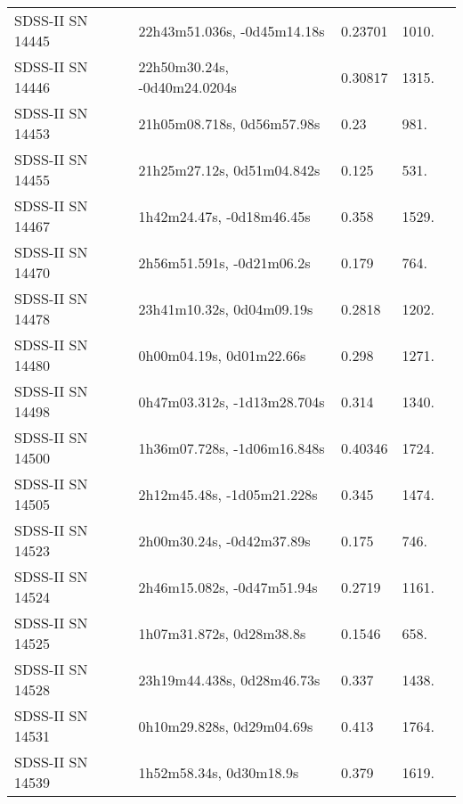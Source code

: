 \begin{longtable}{lllll}
 SDSS-II SN 14445 &    22h43m51.036s, -0d45m14.18s &  0.23701 &          1010. &    \citet{2016SDSSD.C...0000:} \\
 SDSS-II SN 14446 &   22h50m30.24s, -0d40m24.0204s &  0.30817 &          1315. &    \citet{2016SDSSD.C...0000:} \\
 SDSS-II SN 14453 &     21h05m08.718s, 0d56m57.98s &     0.23 &           981. &    \citet{2011ApJ...738..162S} \\
 SDSS-II SN 14455 &     21h25m27.12s, 0d51m04.842s &    0.125 &           531. &    \citet{2011ApJ...738..162S} \\
 SDSS-II SN 14467 &      1h42m24.47s, -0d18m46.45s &    0.358 &          1529. &    \citet{2010ApJ...713.1026D} \\
 SDSS-II SN 14470 &      2h56m51.591s, -0d21m06.2s &    0.179 &           764. &    \citet{2010ApJ...713.1026D} \\
 SDSS-II SN 14478 &      23h41m10.32s, 0d04m09.19s &   0.2818 &          1202. &    \citet{2011ApJ...738..162S} \\
 SDSS-II SN 14480 &       0h00m04.19s, 0d01m22.66s &    0.298 &          1271. &    \citet{2011ApJ...738..162S} \\
 SDSS-II SN 14498 &    0h47m03.312s, -1d13m28.704s &    0.314 &          1340. &    \citet{2011ApJ...738..162S} \\
 SDSS-II SN 14500 &    1h36m07.728s, -1d06m16.848s &  0.40346 &          1724. &    \citet{2016SDSSD.C...0000:} \\
 SDSS-II SN 14505 &     2h12m45.48s, -1d05m21.228s &    0.345 &          1474. &    \citet{2011ApJ...738..162S} \\
 SDSS-II SN 14523 &      2h00m30.24s, -0d42m37.89s &    0.175 &           746. &    \citet{2011ApJ...738..162S} \\
 SDSS-II SN 14524 &     2h46m15.082s, -0d47m51.94s &   0.2719 &          1161. &    \citet{2011ApJ...738..162S} \\
 SDSS-II SN 14525 &       1h07m31.872s, 0d28m38.8s &   0.1546 &           658. &    \citet{2011ApJ...738..162S} \\
 SDSS-II SN 14528 &     23h19m44.438s, 0d28m46.73s &    0.337 &          1438. &    \citet{2010ApJ...713.1026D} \\
 SDSS-II SN 14531 &      0h10m29.828s, 0d29m04.69s &    0.413 &          1764. &    \citet{2011ApJ...738..162S} \\
 SDSS-II SN 14539 &        1h52m58.34s, 0d30m18.9s &    0.379 &          1619. &    \citet{2010ApJ...713.1026D} \\

\end{longtable}
